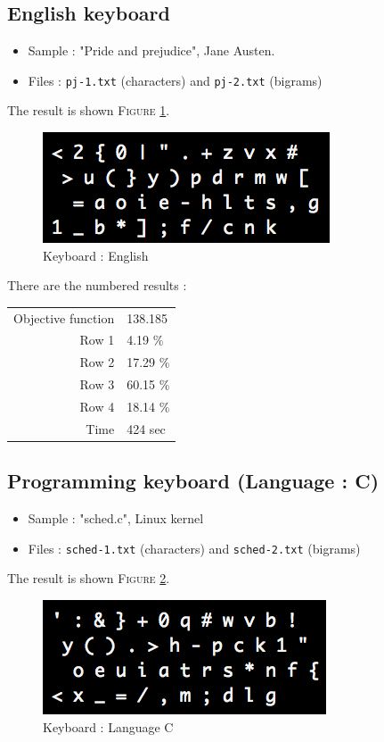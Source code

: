 \documentclass[a4paper,titlepage]{article}
\begin{document}
	\subsection{English keyboard}

\begin{itemize}
	\item Sample : "Pride and prejudice", Jane Austen.
	\item Files : \texttt{pj-1.txt} (characters) and \texttt{pj-2.txt} (bigrams)
\end{itemize}
The result is shown \textsc{Figure} \ref{english}.
\begin{figure}[h]
	\centering
	\includegraphics[scale=1]{images/English.png}
	\caption{Keyboard : English}
	\label{english}
\end{figure}

There are the numbered results : 
\begin{center}
	\begin{tabular}{r|l}
		Objective function & 138.185\\
		Row 1 & 4.19 \%\\
		Row 2 & 17.29 \%\\
		Row 3 & 60.15 \%\\
		Row 4 & 18.14 \%\\
		Time & 424 sec
	\end{tabular}
\end{center}

	\subsection{Programming keyboard (Language : C)}

\begin{itemize}
	\item Sample : "sched.c", Linux kernel
	\item Files : \texttt{sched-1.txt} (characters) and \texttt{sched-2.txt} (bigrams)
\end{itemize}
The result is shown \textsc{Figure} \ref{C}.
\begin{figure}[h]
	\centering
	\includegraphics[scale=1]{images/C.png}
	\caption{Keyboard : Language C}
	\label{C}
\end{figure}
\end{document}
